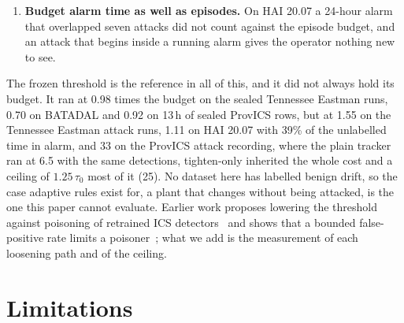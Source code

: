 \documentclass[sigconf,review,anonymous]{acmart}
\begin{document}
\begin{enumerate}
  when drift raises false alarms~\cite{cretu2008sanitizing}. Our only evidence is negative: a gate
  that approved loosening whenever the alarm log was quiet let the silent campaign through, and an
  oracle that blocked loosening only during labelled events caught 1 of 10 terminal steps; recalibration
  that trusts a quiet alarm log was poisoned by pulses too short to count, and recalibration on days an
  oracle knows to be clean was not (Section~\ref{sec:practice}). We tested no human operator.
\item \textbf{Budget alarm time as well as episodes.} On HAI 20.07 a 24-hour alarm that overlapped
  seven attacks did not count against the episode budget, and an attack that begins inside a running
  alarm gives the operator nothing new to see.
\end{enumerate}

The frozen threshold is the reference in all of this, and it did not always hold its budget. It ran at
0.98 times the budget on the sealed Tennessee Eastman runs, 0.70 on BATADAL and 0.92 on 13\,h of sealed
ProvICS rows, but at 1.55 on the Tennessee Eastman attack runs, 1.11 on HAI 20.07 with 39\% of the
unlabelled time in alarm, and 33 on the ProvICS attack recording, where the plain tracker ran at 6.5
with the same detections, tighten-only inherited the whole cost and a ceiling of $1.25\,\tau_0$ most of
it (25). No dataset here has labelled benign drift, so the case adaptive rules exist for, a plant that
changes without being attacked, is the one this paper cannot evaluate. Earlier work proposes lowering
the threshold against poisoning of retrained ICS detectors~\cite{kravchik2021poisoning} and shows that
a bounded false-positive rate limits a poisoner~\cite{kloft2012security}; what we add is the
measurement of each loosening path and of the ceiling.

\section{Limitations}
\label{sec:limitations}
\end{document}
